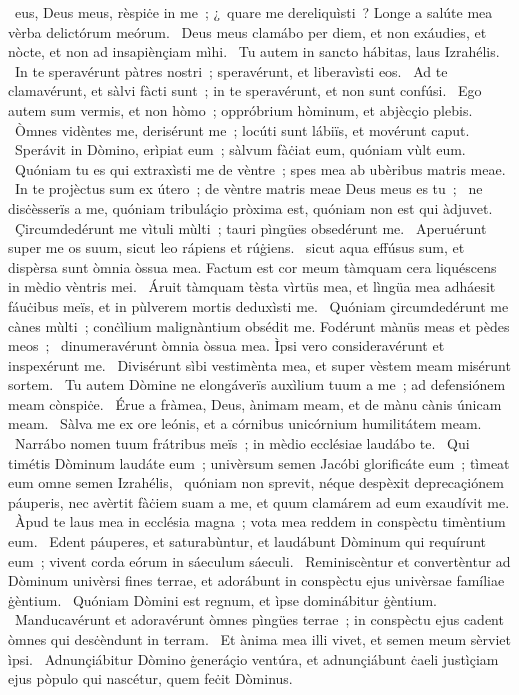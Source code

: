 \psalmChapterWithInscription{}
{ }
{%
~eus, Deus meus, rèspiċe in me~; ¿~quare me dereliquìsti~? Longe a salúte mea vèrba delictórum meórum. 
~Deus meus clamábo per diem, et non exáudies, et nòcte, et non ad insapiènçiam mìhi. 
~Tu autem in sancto hábitas, laus Izrahélis. 
~In te speravérunt pàtres nostri~; speravérunt, et liberavìsti eos. 
~Ad te clamavérunt, et sàlvi fàcti sunt~; in te speravérunt, et non sunt confúsi. 
~Ego autem sum vermis, et non hòmo~; oppróbrium hòminum, et abjècçio plebis. 
~Òmnes vidèntes me, derisérunt me~; locúti sunt lábiïs, et movérunt caput. 
~Sperávit in Dòmino, erìpiat eum~; sàlvum fàċiat eum, quóniam vùlt eum. 
~Quóniam tu es qui extraxìsti me de vèntre~; spes mea ab ubèribus matris meae. 
~In te projèctus sum ex útero~; de vèntre matris meae Deus meus es tu~; 
~ne disċèsserïs a me, quóniam tribuláçio pròxima est, quóniam non est qui àdjuvet. 
~Çircumdedérunt me vìtuli mùlti~; tauri pìngües obsedérunt me. 
~Aperuérunt super me os suum, sicut leo rápiens et rúġiens. 
~sicut aqua effúsus sum, et dispèrsa sunt òmnia òssua mea. Factum est cor meum tàmquam cera liquéscens in mèdio vèntris mei. 
~Áruit tàmquam tèsta vìrtüs mea, et lìngüa mea adháesit fáuċibus meïs, et in pùlverem mortis deduxìsti me. 
~Quóniam çircumdedérunt me cànes mùlti~; conċìlium malignàntium obsédit me. Fodérunt mànüs meas et pèdes meos~; 
~dinumeravérunt òmnia òssua mea. Ìpsi vero consideravérunt et inspexérunt me. 
~Divisérunt sìbi vestimènta mea, et super vèstem meam misérunt sortem. 
~Tu autem Dòmine ne elongáverïs auxìlium tuum a me~; ad defensiónem meam cònspiċe. 
~Érue a fràmea, Deus, ànimam meam, et de mànu cànis únicam meam. 
~Sàlva me ex ore leónis, et a córnibus unicórnium humilitátem meam. 
~Narrábo nomen tuum frátribus meïs~; in mèdio ecclésiae laudábo te. 
~Qui timétis Dòminum laudáte eum~; univèrsum semen Jacóbi glorificáte eum~; tìmeat eum omne semen Izrahélis, 
~quóniam non sprevit, néque despèxit deprecaçiónem páuperis, nec avèrtit fàċiem suam a me, et quum clamárem ad eum exaudívit me. 
~Àpud te laus mea in ecclésia magna~; vota mea reddem in conspèctu timèntium eum. 
~Edent páuperes, et saturabùntur, et laudábunt Dòminum qui requírunt eum~; vivent corda eórum in sáeculum sáeculi. 
~Reminiscèntur et convertèntur ad Dòminum univèrsi fines terrae, et adorábunt in conspèctu ejus univèrsae famíliae ġèntium. 
~Quóniam Dòmini est regnum, et ìpse dominábitur ġèntium. 
~Manducavérunt et adoravérunt òmnes pìngües terrae~; in conspèctu ejus cadent òmnes qui desċèndunt in terram. 
~Et ànima mea illi vivet, et semen meum sèrviet ìpsi. 
~Adnunçiábitur Dòmino ġeneráçio ventúra, et adnunçiábunt ċaeli justìçiam ejus pòpulo qui nascétur, quem feċit Dòminus. 
}
